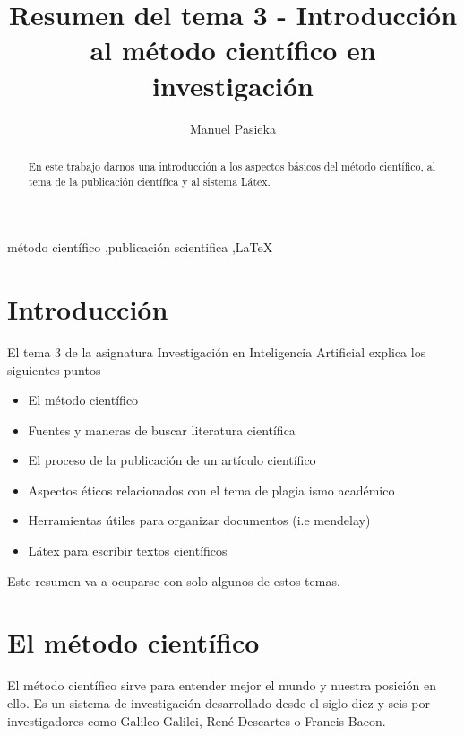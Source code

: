 \documentclass[article]{elsarticle}
\begin{document}
\begin{frontmatter}

\title{Resumen del tema 3 - Introducción al método científico en investigación}

\author{Manuel Pasieka}

\begin{abstract}
En este trabajo darnos una introducción a los aspectos básicos del método científico, al tema de la publicación científica y al sistema Látex. 
\end{abstract}

\begin{keyword}
método científico \sep publicación scientifica \sep \LaTeX
\end{keyword}

\end{frontmatter}


\section{Introducción}
El tema 3 de la asignatura Investigación en Inteligencia Artificial explica los siguientes puntos

\begin{itemize}
\item El método científico
\item Fuentes y maneras de buscar literatura científica
\item El proceso de la publicación de un artículo científico
\item Aspectos éticos relacionados con el tema de plagia ismo académico
\item Herramientas útiles para organizar documentos (i.e mendelay)
\item Látex para escribir textos científicos
\end{itemize}

\vspace{1.5\baselineskip}

Este resumen va a ocuparse con solo algunos de estos temas.

\section{El método científico}

El método científico sirve para entender mejor el mundo y nuestra posición en ello.
Es un sistema de investigación desarrollado desde el siglo diez y seis por
investigadores como Galileo Galilei, René Descartes o Francis Bacon.
\end{document}
